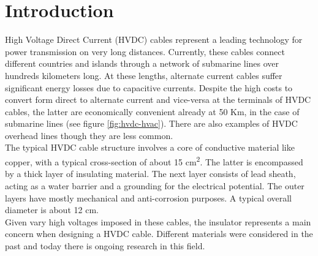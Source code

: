 \documentclass[11pt,a4paper]{article}
\begin{document}



\section{Introduction}
\label{sec:introduction}
High Voltage Direct Current (HVDC) cables represent a leading technology for power transmission on very long distances. Currently, these cables connect different countries and islands through a network of submarine lines over hundreds kilometers long. At these lengths, alternate current cables suffer significant energy losses due to capacitive currents. Despite the high costs to convert form direct to alternate current and vice-versa at the terminals of HVDC cables, the latter are economically convenient already at 50 Km, in the case of submarine lines (see figure \ref{fig:hvdc-hvac}). There are also examples of HVDC overhead lines though they are less common.\\
The typical HVDC cable structure involves a core of conductive material like copper, with a typical cross-section of about 15 cm\textsuperscript{2}. The latter is encompassed by a thick layer of insulating material. The next layer consists of lead sheath, acting as a water barrier and a grounding for the electrical potential. The outer layers have mostly mechanical and anti-corrosion purposes. A typical overall diameter is about 12 cm.\\
Given vary high voltages imposed in these cables, the insulator represents a main concern when designing a HVDC cable. Different materials were considered in the past and today there is ongoing research in this field.
\end{document}
